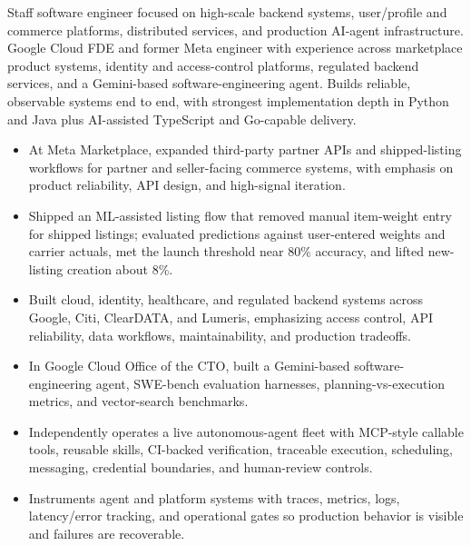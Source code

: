 


Staff software engineer focused on high-scale backend systems, user/profile and commerce platforms, distributed services, and production AI-agent infrastructure. Google Cloud FDE and former Meta engineer with experience across marketplace product systems, identity and access-control platforms, regulated backend services, and a Gemini-based software-engineering agent. Builds reliable, observable systems end to end, with strongest implementation depth in Python and Java plus AI-assisted TypeScript and Go-capable delivery.
\begin{itemize}
  \item At Meta Marketplace, expanded third-party partner APIs and shipped-listing workflows for partner and seller-facing commerce systems, with emphasis on product reliability, API design, and high-signal iteration.
  \item Shipped an ML-assisted listing flow that removed manual item-weight entry for shipped listings; evaluated predictions against user-entered weights and carrier actuals, met the launch threshold near 80\% accuracy, and lifted new-listing creation about 8\%.
  \item Built cloud, identity, healthcare, and regulated backend systems across Google, Citi, ClearDATA, and Lumeris, emphasizing access control, API reliability, data workflows, maintainability, and production tradeoffs.
\end{itemize}
\begin{itemize}
  \item In Google Cloud Office of the CTO, built a Gemini-based software-engineering agent, SWE-bench evaluation harnesses, planning-vs-execution metrics, and vector-search benchmarks.
  \item Independently operates a live autonomous-agent fleet with MCP-style callable tools, reusable skills, CI-backed verification, traceable execution, scheduling, messaging, credential boundaries, and human-review controls.
  \item Instruments agent and platform systems with traces, metrics, logs, latency/error tracking, and operational gates so production behavior is visible and failures are recoverable.
\end{itemize}




